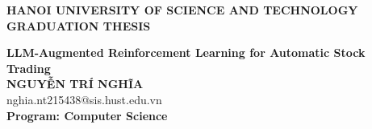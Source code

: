 \begin{titlepage}
  \begin{center}

    {\textbf{\large{HANOI UNIVERSITY OF SCIENCE AND TECHNOLOGY}}}\\[4cm]

    {\textbf{\huge{ GRADUATION THESIS}}}\\[1cm]
    {\textbf{\Large{LLM-Augmented Reinforcement Learning for Automatic Stock Trading}}\\[1cm]

      {\textbf{\large{NGUYỄN TRÍ NGHĨA}}}\\
      {\large{nghia.nt215438@sis.hust.edu.vn}}\\[0.5cm]

      {\textbf{\large{Program: Computer Science}}}\\

      \vspace{2cm}
      \begin{table}[H]
        \centering
    \end{table}}
  \end{center}

\end{titlepage}
